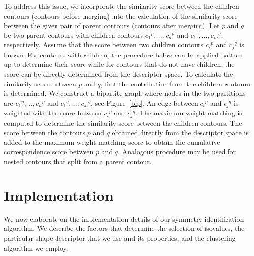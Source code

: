 \documentclass[review,journal]{vgtc}         %
\begin{document}
To address this issue, we incorporate the similarity score between the children contours 
(contours before merging) into the calculation of the similarity score between the given pair
of parent contours (contours after merging). Let $p$ and $q$ be two parent contours
with children contours ${c_1}^p,\dots,{c_n}^p$ and ${c_1}^q,\dots,{c_m}^q$, respectively. 
Assume that the score between two
children contours ${c_i}^p$ and ${c_j}^q$ is known. For contours with children,
the procedure below can be applied bottom up to determine their score
while for contours that do not have children, the score can be directly 
determined from the descriptor space. To calculate the similarity score
between $p$ and $q$, first the contribution from the children contours 
is determined. We construct a bipartite graph where nodes in the two partitions
are ${c_1}^p,\dots,{c_n}^p$ and ${c_1}^q,\dots,{c_m}^q$,
see Figure~\ref{bip}. An edge between ${c_i}^p$ and ${c_j}^q$ is weighted
with the score between ${c_i}^p$ and ${c_j}^q$. The maximum weight
matching is computed to determine the similarity score between the children
contours. The score between the contours $p$ and $q$ obtained
directly from the descriptor space is added to the maximum weight matching score
to obtain the cumulative correspondence score between $p$ and $q$. Analogous procedure
may be used for nested contours that split from a parent contour.
\section{Implementation}
We now elaborate on the implementation details of our symmetry identification algorithm.
We describe the factors that determine the selection of isovalues, the particular shape descriptor
that we use and its properties, and the clustering algorithm we employ.
\end{document}
